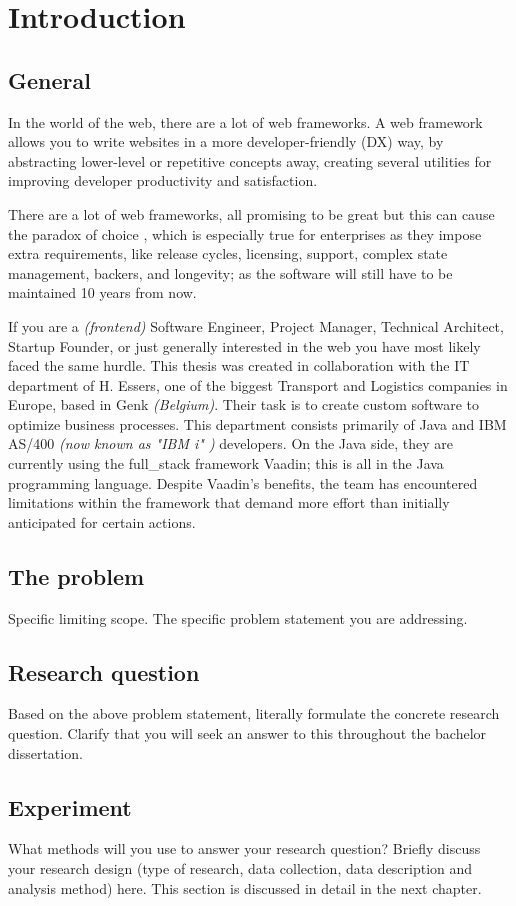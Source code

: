 \chapter{Introduction}
\section{General}
In the world of the web, there are a lot of web frameworks. A web framework allows you to write websites in a more developer-friendly (DX) way, by abstracting lower-level or repetitive concepts away, creating several utilities for improving developer productivity and satisfaction. 

\medskip

There are a lot of web frameworks, all promising to be great but this can cause the paradox of choice \cite{the_decision_lab:paradox_of_choice}, which is especially true for enterprises as they impose extra requirements, like release cycles, licensing, support, complex state management, backers, and longevity; as the software will still have to be maintained 10 years from now.

\medskip

If you are a \textit{(frontend)} Software Engineer, Project Manager, Technical Architect, Startup Founder, or just generally interested in the web you have most likely faced the same hurdle.
This thesis was created in collaboration with the IT department of H. Essers, one of the biggest Transport and Logistics companies in Europe, based in Genk \textit{(Belgium)}. Their task is to create custom software to optimize business processes. This department consists primarily of Java and IBM AS/400 \textit{(now known as "IBM i" \cite{enwiki:ibm_i})} developers. On the Java side, they are currently using the \gls{full_stack} framework Vaadin; this is all in the Java programming language. Despite Vaadin's benefits, the team has encountered limitations within the framework that demand more effort than initially anticipated for certain actions.


\section{The problem}
Specific limiting scope. The specific problem statement you are addressing. 

\section{Research question}
Based on the above problem statement, literally formulate the concrete research question. Clarify that you will seek an answer to this throughout the bachelor dissertation.

\section{Experiment}
What methods will you use to answer your research question? Briefly discuss your research design (type of research, data collection, data description and analysis method) here. This section is discussed in detail in the next chapter.
